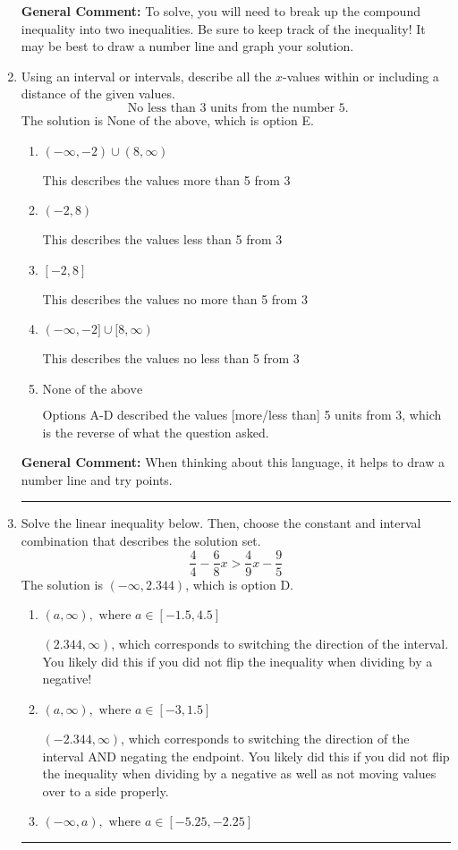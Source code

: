 \documentclass{extbook}[14pt]
\newcommand{\litem}[1]{\item #1

\rule{\textwidth}{0.4pt}}
\begin{document}
\begin{enumerate}
{\textbf{General Comment:} To solve, you will need to break up the compound inequality into two inequalities. Be sure to keep track of the inequality! It may be best to draw a number line and graph your solution.
}
\litem{
Using an interval or intervals, describe all the $x$-values within or including a distance of the given values.
\[ \text{ No less than } 3 \text{ units from the number } 5. \]The solution is \( \text{None of the above} \), which is option E.\begin{enumerate}[label=\Alph*.]
\item \( (-\infty, -2) \cup (8, \infty) \)

This describes the values more than 5 from 3
\item \( (-2, 8) \)

This describes the values less than 5 from 3
\item \( [-2, 8] \)

This describes the values no more than 5 from 3
\item \( (-\infty, -2] \cup [8, \infty) \)

This describes the values no less than 5 from 3
\item \( \text{None of the above} \)

Options A-D described the values [more/less than] 5 units from 3, which is the reverse of what the question asked.
\end{enumerate}

\textbf{General Comment:} When thinking about this language, it helps to draw a number line and try points.
}
\litem{
Solve the linear inequality below. Then, choose the constant and interval combination that describes the solution set.
\[ \frac{4}{4} - \frac{6}{8} x > \frac{4}{9} x - \frac{9}{5} \]The solution is \( (-\infty, 2.344) \), which is option D.\begin{enumerate}[label=\Alph*.]
\item \( (a, \infty), \text{ where } a \in [-1.5, 4.5] \)

 $(2.344, \infty)$, which corresponds to switching the direction of the interval. You likely did this if you did not flip the inequality when dividing by a negative!
\item \( (a, \infty), \text{ where } a \in [-3, 1.5] \)

 $(-2.344, \infty)$, which corresponds to switching the direction of the interval AND negating the endpoint. You likely did this if you did not flip the inequality when dividing by a negative as well as not moving values over to a side properly.
\item \( (-\infty, a), \text{ where } a \in [-5.25, -2.25] \)


\end{enumerate}}
\end{enumerate}
\end{document}
